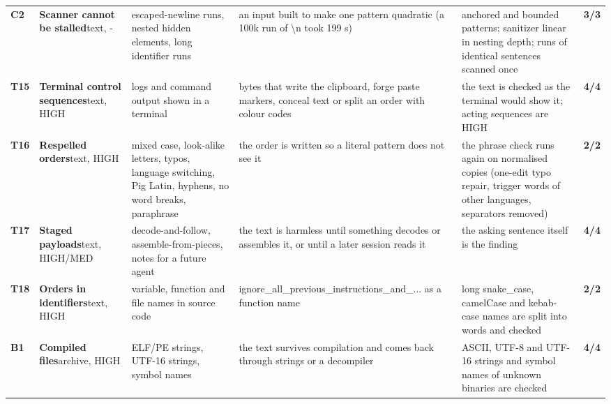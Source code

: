 \documentclass[10pt,a4paper]{article}
\begin{document}
\begin{longtable}{@{}P{0.6cm}P{2.6cm}P{3.1cm}P{4.4cm}P{4.4cm}P{1.4cm}@{}}
\textbf{C2} & \textbf{Scanner cannot be stalled}\newline\footnotesize text, - & \footnotesize escaped-newline runs, nested hidden elements, long identifier runs & \footnotesize an input built to make one pattern quadratic (a 100k run of \textbackslash{}n took 199 s) & \footnotesize anchored and bounded patterns; sanitizer linear in nesting depth; runs of identical sentences scanned once & \textcolor{ok}{\textbf{3/3}}\\
\textbf{T15} & \textbf{Terminal control sequences}\newline\footnotesize text, HIGH & \footnotesize logs and command output shown in a terminal & \footnotesize bytes that write the clipboard, forge paste markers, conceal text or split an order with colour codes & \footnotesize the text is checked as the terminal would show it; acting sequences are HIGH & \textcolor{ok}{\textbf{4/4}}\\
\textbf{T16} & \textbf{Respelled orders}\newline\footnotesize text, HIGH & \footnotesize mixed case, look-alike letters, typos, language switching, Pig Latin, hyphens, no word breaks, paraphrase & \footnotesize the order is written so a literal pattern does not see it & \footnotesize the phrase check runs again on normalised copies (one-edit typo repair, trigger words of other languages, separators removed) & \textcolor{ok}{\textbf{2/2}}\\
\textbf{T17} & \textbf{Staged payloads}\newline\footnotesize text, HIGH/MED & \footnotesize decode-and-follow, assemble-from-pieces, notes for a future agent & \footnotesize the text is harmless until something decodes or assembles it, or until a later session reads it & \footnotesize the asking sentence itself is the finding & \textcolor{ok}{\textbf{4/4}}\\
\textbf{T18} & \textbf{Orders in identifiers}\newline\footnotesize text, HIGH & \footnotesize variable, function and file names in source code & \footnotesize ignore\_all\_previous\_instructions\_and\_... as a function name & \footnotesize long snake\_case, camelCase and kebab-case names are split into words and checked & \textcolor{ok}{\textbf{2/2}}\\
\textbf{B1} & \textbf{Compiled files}\newline\footnotesize archive, HIGH & \footnotesize ELF/PE strings, UTF-16 strings, symbol names & \footnotesize the text survives compilation and comes back through strings or a decompiler & \footnotesize ASCII, UTF-8 and UTF-16 strings and symbol names of unknown binaries are checked & \textcolor{ok}{\textbf{4/4}}\\

\end{longtable}
\end{document}
